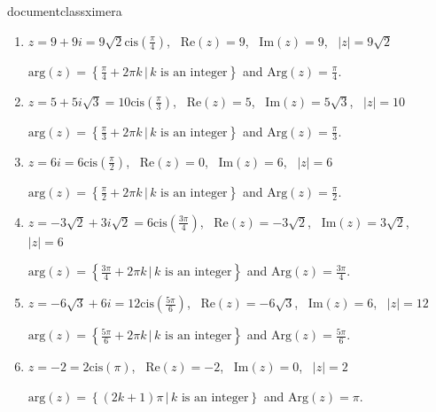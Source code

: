 documentclass{ximera}


	\author{Stitz-Zeager}



\begin{enumerate}

\item $z = 9 + 9i = 9\sqrt{2}\text{cis}\left(\frac{\pi}{4}\right)$, \, $\text{Re}(z) = 9$, \, $\text{Im}(z) = 9$, \, $|z| = 9\sqrt{2}$

$\text{arg}(z) = \left\{\frac{\pi}{4} + 2\pi k \, | \, \text{$k$ is an integer} \right\}$ and $\text{Arg}(z) = \frac{\pi}{4}$.

\item $z = 5+5i\sqrt{3} = 10\text{cis}\left(\frac{\pi}{3}\right)$, \, $\text{Re}(z) = 5$, \, $\text{Im}(z) = 5\sqrt{3}$, \, $|z| = 10$

$\text{arg}(z) = \left\{\frac{\pi}{3} + 2\pi k \, | \, \text{$k$ is an integer} \right\}$ and $\text{Arg}(z) = \frac{\pi}{3}$.

\item $z = 6i = 6\text{cis}\left(\frac{\pi}{2}\right)$, \, $\text{Re}(z) = 0$, \, $\text{Im}(z) = 6$, \, $|z| = 6$

$\text{arg}(z) = \left\{\frac{\pi}{2} + 2\pi k \, | \, \text{$k$ is an integer} \right\}$ and $\text{Arg}(z) = \frac{\pi}{2}$.

\item $z = -3\sqrt{2} + 3i\sqrt{2} = 6\text{cis}\left(\frac{3\pi}{4}\right)$, \, $\text{Re}(z) = -3\sqrt{2}$, \, $\text{Im}(z) =3\sqrt{2}$, \, $|z| = 6$

$\text{arg}(z) = \left\{\frac{3\pi}{4} + 2\pi k \, | \, \text{$k$ is an integer} \right\}$ and $\text{Arg}(z) = \frac{3\pi}{4}$.

\item $z =  -6\sqrt{3} + 6i = 12\text{cis}\left(\frac{5\pi}{6}\right)$, \, $\text{Re}(z) = -6\sqrt{3}$, \, $\text{Im}(z) =6$, \, $|z| = 12$

$\text{arg}(z) = \left\{\frac{5\pi}{6} + 2\pi k \, | \, \text{$k$ is an integer} \right\}$ and $\text{Arg}(z) = \frac{5\pi}{6}$.

\item $z =  -2 = 2\text{cis}\left(\pi\right)$, \, $\text{Re}(z) = -2$, \, $\text{Im}(z) =0$, \, $|z| = 2$

$\text{arg}(z) = \left\{(2k+1)\pi \, | \, \text{$k$ is an integer} \right\}$ and $\text{Arg}(z) = \pi$.


\end{enumerate}
